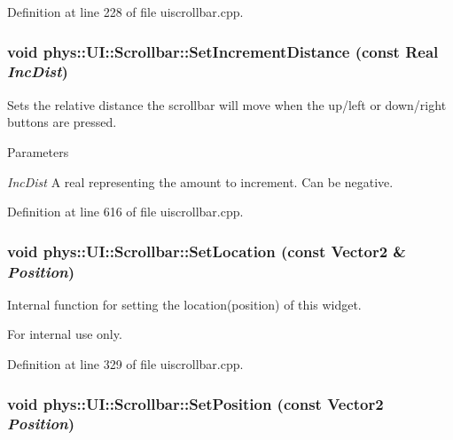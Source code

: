 Definition at line 228 of file uiscrollbar.cpp.

\hypertarget{classphys_1_1UI_1_1Scrollbar_ac2d5081e3d91f0bc02b935b64a5316f9}{
\subsubsection[{SetIncrementDistance}]{\setlength{\rightskip}{0pt plus 5cm}void phys::UI::Scrollbar::SetIncrementDistance (const {\bf Real} {\em IncDist})}}
\label{d0/d3e/classphys_1_1UI_1_1Scrollbar_ac2d5081e3d91f0bc02b935b64a5316f9}


Sets the relative distance the scrollbar will move when the up/left or down/right buttons are pressed. 


\begin{DoxyParams}{Parameters}
\item[{\em IncDist}]A real representing the amount to increment. Can be negative. \end{DoxyParams}


Definition at line 616 of file uiscrollbar.cpp.

\hypertarget{classphys_1_1UI_1_1Scrollbar_add3d5f729e542fe17eda663fce86d3a3}{
\subsubsection[{SetLocation}]{\setlength{\rightskip}{0pt plus 5cm}void phys::UI::Scrollbar::SetLocation (const {\bf Vector2} \& {\em Position})}}
\label{d0/d3e/classphys_1_1UI_1_1Scrollbar_add3d5f729e542fe17eda663fce86d3a3}


Internal function for setting the location(position) of this widget. 

\begin{DoxyInternal}{For internal use only.}
\end{DoxyInternal}


Definition at line 329 of file uiscrollbar.cpp.

\hypertarget{classphys_1_1UI_1_1Scrollbar_a6a61740b90f640463fff1ebe46ca68e9}{
\subsubsection[{SetPosition}]{\setlength{\rightskip}{0pt plus 5cm}void phys::UI::Scrollbar::SetPosition (const {\bf Vector2} {\em Position})}}
\label{d0/d3e/classphys_1_1UI_1_1Scrollbar_a6a61740b90f640463fff1ebe46ca68e9}



